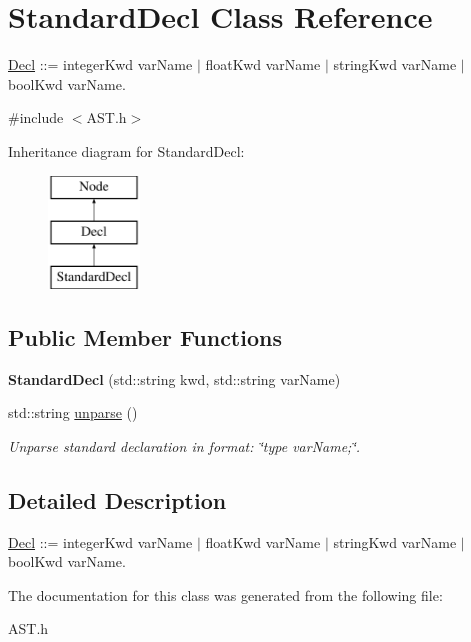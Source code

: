 \hypertarget{classStandardDecl}{\section{Standard\-Decl Class Reference}
\label{classStandardDecl}
}


\hyperlink{classDecl}{Decl} \-:\-:= integer\-Kwd var\-Name $\vert$ float\-Kwd var\-Name $\vert$ string\-Kwd var\-Name $\vert$ bool\-Kwd var\-Name.  




{\ttfamily \#include $<$A\-S\-T.\-h$>$}

Inheritance diagram for Standard\-Decl\-:\begin{figure}[H]
\begin{center}
\leavevmode
\includegraphics[height=3.000000cm]{classStandardDecl}
\end{center}
\end{figure}
\subsection*{Public Member Functions}
\begin{DoxyCompactItemize}
\item 
\hypertarget{classStandardDecl_ae705d27eabb569629722ae74c4863389}{{\bfseries Standard\-Decl} (std\-::string kwd, std\-::string var\-Name)}\label{classStandardDecl_ae705d27eabb569629722ae74c4863389}

\item 
\hypertarget{classStandardDecl_a2666e01d836103d4a4338a2c54106db5}{std\-::string \hyperlink{classStandardDecl_a2666e01d836103d4a4338a2c54106db5}{unparse} ()}\label{classStandardDecl_a2666e01d836103d4a4338a2c54106db5}

\begin{DoxyCompactList}\small\item\em Unparse standard declaration in format\-: \char`\"{}type var\-Name;\char`\"{}. \end{DoxyCompactList}\end{DoxyCompactItemize}


\subsection{Detailed Description}
\hyperlink{classDecl}{Decl} \-:\-:= integer\-Kwd var\-Name $\vert$ float\-Kwd var\-Name $\vert$ string\-Kwd var\-Name $\vert$ bool\-Kwd var\-Name. 

The documentation for this class was generated from the following file\-:\begin{DoxyCompactItemize}
\item 
A\-S\-T.\-h\end{DoxyCompactItemize}
